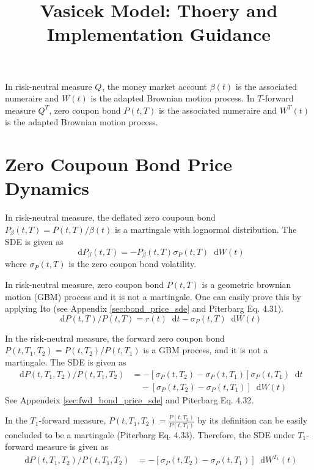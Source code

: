 \documentclass[12pt]{article}
\newcommand{\dd}{\mathop{}\!\text{d}}
\newcommand{\qBrownian}[1]{W(#1)}
\newcommand{\tBrownian}[1]{W^{T}(#1)}
\newcommand{\measure}[1][]{Q^{#1}}
\newcommand{\qMeasure}{\measure}
\newcommand{\TMeasure}{\measure[T]}
\newcommand{\sigmaP}{\sigma_P}
\newcommand{\piterbargEq}[1]{Piterbarg Eq. #1}
\begin{document}
\title{Vasicek Model: Thoery and Implementation Guidance}
\maketitle
\tableofcontents
\newpage

In risk-neutral measure $\qMeasure$, the money market account $\beta(t)$ is the associated
numeraire and $\qBrownian{t}$ is the adapted Brownian motion process. In $T$-forward measure $\TMeasure$,
zero coupon bond $P(t, T)$ is the associated numeraire and $\tBrownian{t}$ is the adapted
Brownian motion process.

\section{Zero Coupoun Bond Price Dynamics}
In risk-neutral measure, the deflated zero coupoun bond $P_{\beta}(t, T) = P(t, T)/\beta(t)$
is a martingale with lognormal distribution. The SDE is given as
\begin{equation}
    \dd P_\beta(t, T)  = - P_\beta(t, T) \sigma_P(t, T) \dd \qBrownian{t}
\end{equation}
where $\sigma_P(t,T)$ is the zero coupon bond volatility.

In risk-neutral measure, zero coupon bond $P(t, T)$ is a geometric brownian motion (GBM)
process and it is not a martingale. One can easily prove this by applying Ito
(see Appendix \ref{sec:bond_price_sde} and \piterbargEq{4.31}).
\begin{equation}
    \dd P(t, T)/P(t, T) = r(t) \dd t - \sigma_P(t, T) \dd \qBrownian{t}
\end{equation}

In the risk-neutral measure, the forward zero coupon bond
$P(t, T_1, T_2) = P(t, T_2)/P(t, T_1)$ is a GBM process, and
it is not a martingale. The SDE is given as
\begin{align}
    \label{eq:fwd_bond_sde_rn_measure}
    \dd P(t, T_1, T_2)/P(t, T_1, T_2)  
    &= -\left[\sigmaP(t, T_2) - \sigmaP(t, T_1)\right] \sigmaP(t, T_1) \dd t \nonumber \\ 
    &\quad -\left[\sigmaP(t, T_2) - \sigmaP(t, T_1)\right] \dd \qBrownian{t}
\end{align}
See Appendeix \ref{sec:fwd_bond_price_sde} and \piterbargEq{4.32}.

In the $T_1$-forward measure, $P(t, T_1, T_2)=\frac{P(t, T_2)}{P(t, T_1)}$
by its definition can be easily concluded to be a martingale (\piterbargEq{4.33}).
Therefore, the SDE under $T_1$-forward measure is given as
\begin{align}
    \label{eq:fwd_bond_sde_T_measure}
    \dd P(t, T_1, T_2)/P(t, T_1, T_2)  
    &= -\left[\sigmaP(t, T_2) - \sigmaP(t, T_1)\right] \dd W^{T_1}(t)
\end{align}
\end{document}

